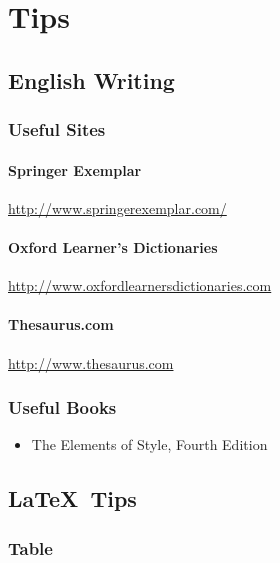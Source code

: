 \chapter{Tips} \label{chapter:tips}

\graphicspath{{Manuscript/Tips/Figs/}}

\section{English Writing}

\subsection{Useful Sites}

\subsubsection{Springer Exemplar}
\url{http://www.springerexemplar.com/}

\subsubsection{Oxford Learner's Dictionaries}
\url{http://www.oxfordlearnersdictionaries.com}

\subsubsection{Thesaurus.com}
\url{http://www.thesaurus.com}


\subsection{Useful Books}

\begin{itemize}
	\item The Elements of Style, Fourth Edition~\cite{strunk1979}
\end{itemize}

\section{\LaTeX ~Tips}

\subsection{Table} \label{sec:table}

